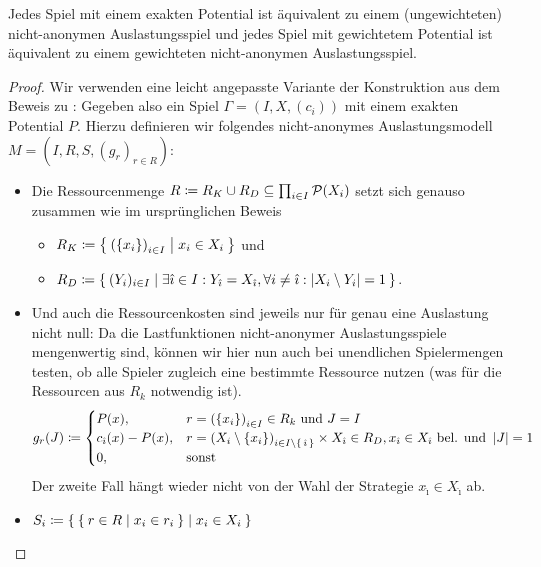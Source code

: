 \begin{satz}\label{satz:ExUndGewPotAlsAnonymeAusl}
	Jedes Spiel mit einem exakten Potential ist äquivalent zu einem (ungewichteten) nicht-anonymen Auslastungsspiel und jedes Spiel mit gewichtetem Potential ist äquivalent zu einem gewichteten nicht-anonymen Auslastungsspiel.
\end{satz}

\begin{proof}
	Wir verwenden eine leicht angepasste Variante der Konstruktion aus dem Beweis zu : Gegeben also ein Spiel $\Gamma = (I, X, (c_i))$ mit einem exakten Potential $P$. Hierzu definieren wir folgendes nicht-anonymes Auslastungsmodell $M = (I, R, S, (g_r)_{r \in R})$:
	\begin{itemize}
		\item Die Ressourcenmenge $R \coloneqq R_K \cup R_D \subseteq \prod_{i \in I}\mathcal{P}(X_i)$ setzt sich genauso zusammen wie im ursprünglichen Beweis
		\begin{itemize}
			\item $R_K \coloneqq \Set{\left(\{x_i\}\right)_{i \in I} | x_i \in X_i }$ und 
			\item $R_D \coloneqq \Set{(Y_i)_{i \in I} | \exists \hat{\imath} \in I: Y_{\hat{\imath}} = X_{\hat{\imath}}, \forall i \neq \hat{\imath}: \left|X_i \setminus Y_i\right| = 1 }$.
		\end{itemize}
		\item Und auch die Ressourcenkosten sind jeweils nur für genau eine Auslastung nicht null: Da die Lastfunktionen nicht-anonymer Auslastungsspiele mengenwertig sind, können wir hier nun auch bei unendlichen Spielermengen testen, ob alle Spieler zugleich eine bestimmte Ressource nutzen (was für die Ressourcen aus $R_k$ notwendig ist).
		\[g_r(J) \coloneqq 
		\begin{cases}
		P(x), 					&r = \left(\{x_i\}\right)_{i \in I} \in R_k 													\text{ und } J=I \\
		c_{\hat{\imath}}(x) - P(x), 	&r = \left(X_i\setminus\{x_i\}\right)_{i \in I\setminus\set{\hat{\imath}}} \times X_{\hat{\imath}} \in R_D, x_{\hat{\imath}} \in X_{\hat{\imath}} \text{ bel. und } \left|J\right|=1 \\
		0,						&\text{sonst}
		\end{cases}
		\]
		Der zweite Fall hängt wieder nicht von der Wahl der Strategie $x_{\hat{\imath}} \in X_{\hat{\imath}}$ ab.
		\item $S_i \coloneqq \Set{ \Set{r \in R | x_i \in r_i} | x_i \in X_i }$
	\end{itemize}

\end{proof}
